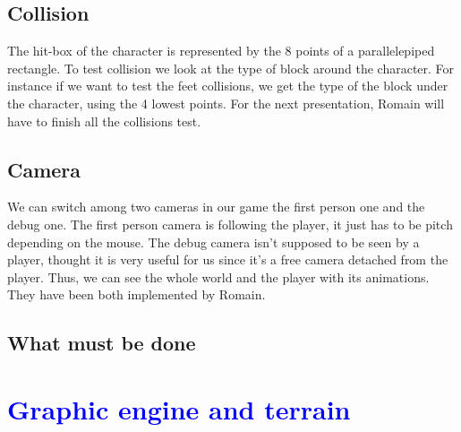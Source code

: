 \documentclass[article]{report} %
\begin{document}
			\section{Collision}
				The hit-box of the character is represented by the 8 points of a parallelepiped rectangle. To test collision we look at the type of block around the character. For instance if we want to test the feet collisions, we get the type of the block under the character, using the 4 lowest points. For the next presentation, Romain will have to finish all the collisions test.

			\section{Camera}
				We can switch among two cameras in our game the first person one and the debug one. The first person camera is following the player, it just has to be pitch depending on the mouse. The debug camera isn't supposed to be seen by a player, thought it is very useful for us since it's a free camera detached from the player. Thus, we can see the whole world and the player with its animations. They have been both implemented by Romain.

			\section{What must be done}
		\chapter{\textcolor{blue}{Graphic engine and terrain}}
\end{document}
